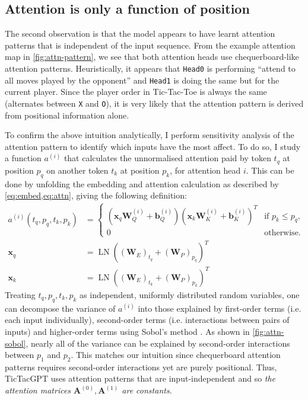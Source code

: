 \documentclass{article}
\newcommand{\ttgpt}{TicTacGPT\xspace}
\newcommand{\ttt}{Tic-Tac-Toe\xspace}
\renewcommand{\v}[1]{\mathbf{\bm{#1}}}
\newcommand{\m}[1]{\mathbf{\bm{#1}}}
\DeclareMathOperator{\layernorm}{LN}
\begin{document}
\subsection{Attention is only a function of position} \label{sec:simplify-attn}



The second observation is that the model appears to have learnt attention patterns that is independent of the input sequence. From the example attention map in \cref{fig:attn-pattern}, we see that both attention heads use chequerboard-like attention patterns. Heuristically, it appears that \texttt{Head0} is performing ``attend to all moves played by the opponent'' and \texttt{Head1} is doing the same but for the current player. Since the player order in \ttt is always the same (alternates between \texttt{X} and \texttt{O}), it is very likely that the attention pattern is derived from positional information alone.

To confirm the above intuition analytically, I perform sensitivity analysis of the attention pattern to identify which inputs have the most affect. To do so, I study a function $a^{(i)}$ that calculates the unnormalised attention paid by token $t_q$ at position $p_q$ on another token $t_k$ at position $p_k$, for attention head $i$. This can be done by unfolding the embedding and attention calculation as described by \cref{eq:embed,eq:attn}, giving the following definition:
\begin{equation*}
    \begin{aligned}
        a^{(i)}(t_q, p_q, t_k, p_k)
         & =\begin{cases}
                \left(\v{x}_q \m{W}_Q^{(i)} + \v{b}_Q^{(i)}\right)
                \left(\v{x}_k \m{W}_K^{(i)} + \v{b}_K^{(i)}\right)^T
                  & \text{if }p_k \leq p_q, \\
                0 & \text{otherwise.}
            \end{cases} \\
        \v{x}_q
         & = \layernorm((\m{W}_E)_{t_q} + (\m{W}_P)_{p_q})^T    \\
        \v{x}_k
         & = \layernorm((\m{W}_E)_{t_k} + (\m{W}_P)_{p_k})^T
    \end{aligned}
\end{equation*}
Treating $t_q, p_q, t_k, p_k$ as independent, uniformly distributed random variables, one can decompose the variance of $a^{(i)}$ into those explained by first-order terms (i.e. each input individually), second-order terms (i.e. interactions between pairs of inputs) and higher-order terms using Sobol's method \citep{sobol1993sensitivity,sobol2001global}. As shown in \cref{fig:attn-sobol}, nearly all of the variance can be explained by second-order interactions between $p_1$ and $p_2$. This matches our intuition since chequerboard attention patterns requires second-order interactions yet are purely positional. Thus, \ttgpt uses attention patterns that are input-independent and so \emph{the attention matrices $\m{A}^{(0)}, \m{A}^{(1)}$ are constants}.
\end{document}
